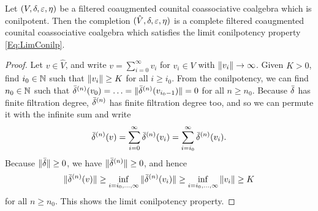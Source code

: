 \documentclass[\MainFolder/Text.tex]{subfiles}
\begin{document}
\begin{Lemma}\label{Lem:SymAlgLimConilp}
Let $(V,\delta,\varepsilon,\eta)$ be a filtered coaugmented counital coassociative coalgebra which is conilpotent. Then the completion $(\hat{V},\delta,\varepsilon,\eta)$ is a complete filtered coaugmented counital coassociative coalgebra which satisfies the limit conilpotency property \eqref{Eq:LimConilp}.
\end{Lemma}
\begin{proof}
Let $v\in \hat{V}$, and write $v = \sum_{i=0}^\infty v_i$ for $v_i\in V$ with $\| v_i \| \to \infty$. Given $K>0$, find $i_0\in \mathbb{N}$ such that $\| v_i \|\ge K$ for all $i\ge i_0$. From the conilpotency, we can find $n_0\in \mathbb{N}$ such that $\bar{\delta}^{(n)}(v_0) = \dotsc = \| \bar{\delta}^{(n)}(v_{i_0-1}) \| = 0$ for all $n\ge n_0$. Because $\bar{\delta}$ has finite filtration degree, $\bar{\delta}^{(n)}$ has finite filtration degree too, and so we can permute it with the infinite sum and write 
$$ \bar{\delta}^{(n)}(v) = \sum_{i=0}^\infty \bar{\delta}^{(n)}(v_i) = \sum_{i=i_0}^\infty \bar{\delta}^{(n)}(v_i). $$
Because $\| \bar{\delta} \| \ge 0$, we have $\| \bar{\delta}^{(n)} \| \ge 0$, and hence 
$$ \| \bar{\delta}^{(n)}(v) \| \ge \inf_{i=i_0,\dotsc,\infty}\| \bar{\delta}^{(n)}(v_i) \| \ge \inf_{i=i_0,\dotsc,\infty} \| v_i \| \ge K $$
for all $n\ge n_0$. This shows the limit conilpotency property.
\end{proof}
\end{document}
